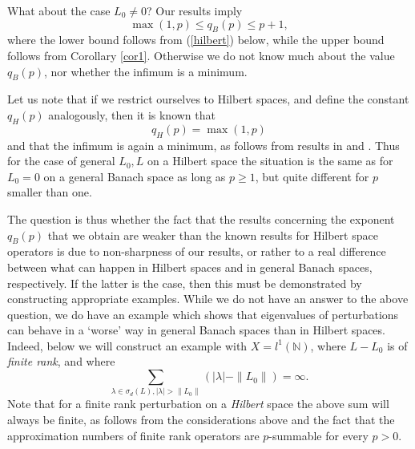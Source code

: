 \documentclass[12pt,a4paper]{article}
\theoremstyle{definition}
\theoremstyle{remark}
\numberwithin{equation}{section}
\newcommand{\mn}{{\mathbb N}}
\begin{document}
What about the case $L_0\neq 0$? Our results imply 
$$ \max(1,p) \leq  q_{{B}}(p) \leq  p+1,$$
where the lower bound follows from (\ref{hilbert}) below, while the upper bound follows from Corollary \ref{cor1}.  Otherwise we do not know 
much about the value $q_{{B}}(p)$, nor whether the infimum is a minimum. 

Let us note that if we restrict ourselves to Hilbert spaces, and define the constant $q_{H}(p)$ analogously, then it is known that
\begin{equation}
\label{hilbert}
 q_{{H}}(p) = \max(1,p)
\end{equation}
and that the infimum is again a minimum, as follows from results in \cite{Hansmann11} and \cite{MR3033958}. Thus for the case of general $L_0,L$ on a Hilbert space the situation is the same as for $L_0=0$ on a general Banach space as long as $p\geq 1$, but quite different for $p$ smaller than one.

The question is thus whether the fact that the results concerning the exponent $q_{B}(p)$ that we obtain are weaker than the known
results for Hilbert space operators is due to non-sharpness of our results, or rather to a real difference between what can happen in Hilbert spaces
and in general Banach spaces, respectively. If the latter is the case, then this must be demonstrated by constructing appropriate examples. 
While we do not have an answer to the above question, we do have an example which shows that eigenvalues of perturbations can  behave
in a `worse' way in general Banach spaces than in Hilbert spaces.
 Indeed, below we will construct an example with $X=l^1(\mn)$, where $L-L_0$ is of {\it{finite rank}}, and where
$$ \sum_{\lambda \in \sigma_d(L), |\lambda|>\|L_0\|}  (|\lambda|-\|L_0\|)=\infty.$$
Note that for a finite rank perturbation on a {\it{Hilbert}} space the above sum will always be finite, as follows from the considerations above and the fact that the approximation numbers of finite rank operators are $p$-summable for every $p>0$.
\end{document}
